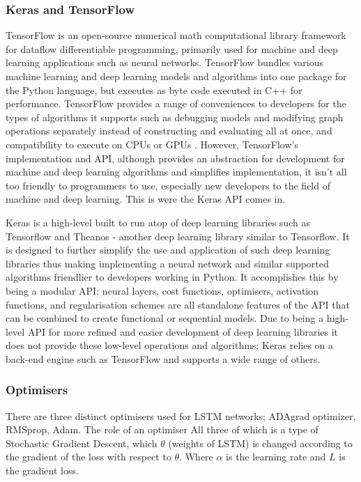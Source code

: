 \documentclass[oneside, 10pt]{article}
\begin{document}
			\subsubsection{Keras and TensorFlow}
			TensorFlow is an open-source numerical math computational library framework for dataflow differentiable programming, primarily used for machine and deep learning applications such as neural networks. TensorFlow bundles various machine learning and deep learning models and algorithms into one package for the Python language, but executes as byte code executed in C++ for performance. TensorFlow provides a range of conveniences to developers for the types of algorithms it supports such as debugging models and modifying graph operations separately instead of constructing and evaluating all at once, and compatibility to execute on CPUs or GPUs \cite{26}. However, TensorFlow's implementation and API, although provides an abstraction for development for machine and deep learning algorithms and simplifies implementation, it isn't all too friendly to programmers to use, especially new developers to the field of machine and deep learning. This is were the Keras API comes in. 
			
			Keras is a high-level built to run atop of deep learning libraries such as Tensorflow and Theanos - another deep learning library similar to Tensorflow. It is designed to further simplify the use and application of such deep learning libraries thus making implementing a neural network and similar supported algorithms friendlier to developers working in Python. It accomplishes this by being a modular API; neural layers, cost functions, optimisers, activation functions, and regularisation schemes are all standalone features of the API that can be combined to create functional or sequential models. Due to being a high-level API for more refined and easier development of deep learning libraries it does not provide these low-level operations and algorithms; Keras relies on a back-end engine such as TensorFlow and supports a wide range of others.
			
			\subsubsection{Optimisers}
			There are three distinct optimisers used for LSTM networks; ADAgrad optimizer, RMSprop, Adam. The role of an optimiser
			All three of which is a type of Stochastic Gradient Descent, which $\theta$ (weights of LSTM) is changed according to the gradient of the loss with respect to $\theta$. Where $\alpha$ is the learning rate and $L$ is the gradient loss. \cite{27}
			
\end{document}
